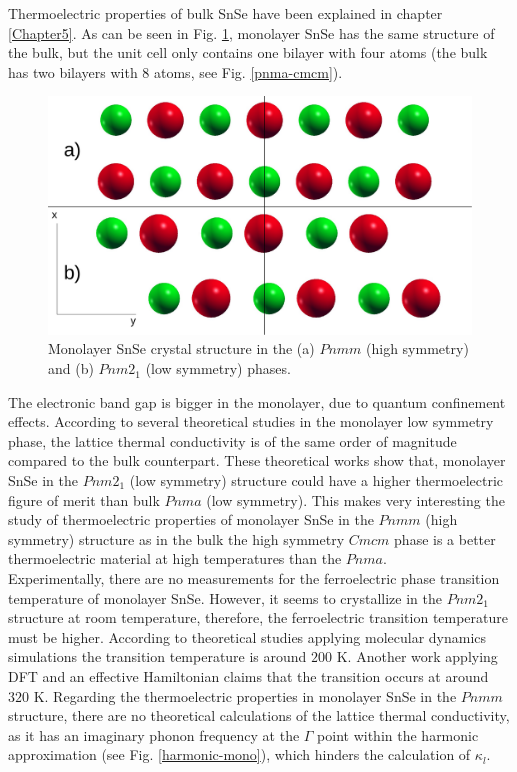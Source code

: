 Thermoelectric properties of bulk SnSe have been explained in chapter \ref{Chapter5}. As can be seen in 
Fig. \ref{pnma-cmcm-mono}, monolayer SnSe has the same structure of the bulk, but the unit cell only contains one 
bilayer with four atoms (the bulk has two bilayers with 8 atoms, see Fig. \ref{pnma-cmcm}). 
\begin{figure}[h]
\begin{center}
\includegraphics[width=0.8\linewidth]{Figures/monolayer-structure.pdf}
	\caption[Monolayer SnSe crystal structure]{Monolayer SnSe crystal structure in the (a) $Pnmm$ (high symmetry) 
	and (b) $Pnm2_{1}$ (low symmetry) phases.}
\label{pnma-cmcm-mono}
\end{center}
\end{figure}
The electronic band gap is bigger in the monolayer\cite{wang2015thermoelectric,hu2017high}, due to quantum 
confinement effects. According to several theoretical studies\cite{wang2015thermoelectric,hu2017high} in the 
monolayer low symmetry phase, the lattice thermal conductivity is of the same order of magnitude compared to the 
bulk counterpart. These theoretical works show that, monolayer SnSe in the $Pnm2_{1}$ (low symmetry) structure could 
have a higher thermoelectric figure of merit\cite{wang2015thermoelectric,hu2017high} than bulk $Pnma$ (low symmetry). This makes very interesting the study of thermoelectric properties of monolayer SnSe in the $Pnmm$ (high 
symmetry) structure as in the bulk the high symmetry $Cmcm$ phase is a better thermoelectric material at high 
temperatures than the $Pnma$. \\

Experimentally, there are no measurements for the ferroelectric phase transition temperature of monolayer SnSe. 
However, it seems to crystallize in the $Pnm2_{1}$ structure at room 
temperature\cite{li2013single,chang2020controlled}, 
therefore, the ferroelectric transition temperature must be higher. According to theoretical studies applying 
molecular dynamics simulations\cite{mehboudi2016structural,barraza2018tuning} the transition temperature is around 
$200$ K. Another work applying DFT and an effective Hamiltonian claims\cite{fei2016ferroelectricity} that the 
transition occurs at around $320$ K. Regarding the thermoelectric properties in monolayer SnSe in the $Pnmm$ 
structure, there are no theoretical calculations of the lattice thermal conductivity, as it has an imaginary phonon 
frequency at the $\Gamma$ point within the harmonic approximation (see Fig. \ref{harmonic-mono}), which hinders the 
calculation of $\kappa_{l}$. \\

